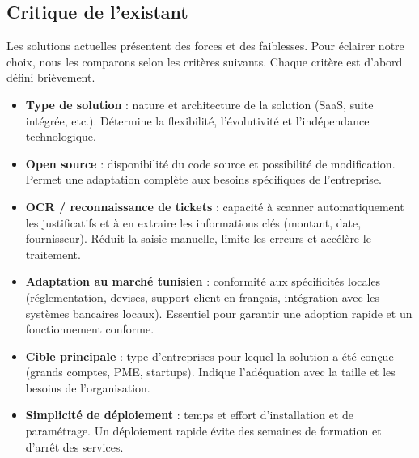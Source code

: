 \documentclass[12pt,a4paper]{report}
\begin{document}
\subsection{Critique de l'existant}

Les solutions actuelles présentent des forces et des faiblesses. Pour éclairer notre choix, nous les comparons selon les critères suivants. Chaque critère est d’abord défini brièvement.





\begin{itemize}

 \item \textbf{Type de solution} : nature et architecture de la solution (SaaS, suite intégrée, etc.). Détermine la flexibilité, l’évolutivité et l’indépendance technologique.

 

 \item \textbf{Open source} : disponibilité du code source et possibilité de modification. Permet une adaptation complète aux besoins spécifiques de l’entreprise.

 

 \item \textbf{OCR / reconnaissance de tickets} : capacité à scanner automatiquement les justificatifs et à en extraire les informations clés (montant, date, fournisseur). Réduit la saisie manuelle, limite les erreurs et accélère le traitement.

 

 \item \textbf{Adaptation au marché tunisien} : conformité aux spécificités locales (réglementation, devises, support client en français, intégration avec les systèmes bancaires locaux). Essentiel pour garantir une adoption rapide et un fonctionnement conforme.

 

 \item \textbf{Cible principale} : type d’entreprises pour lequel la solution a été conçue (grands comptes, PME, startups). Indique l’adéquation avec la taille et les besoins de l’organisation.

 

 \item \textbf{Simplicité de déploiement} : temps et effort d’installation et de paramétrage. Un déploiement rapide évite des semaines de formation et d’arrêt des services.

 


\end{itemize}
\end{document}
